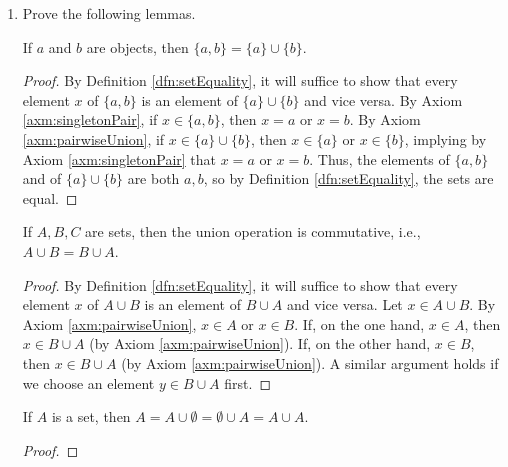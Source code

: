 \documentclass[../main.tex]{subfiles}
\begin{document}
\begin{enumerate}[ref={\thesection.\arabic*}]
\begin{proof}
    \end{proof}
    \item \label{exr:3.1.3}Prove the following lemmas.
    \begin{lem}\label{lem:commutativityUnion}
        If $a$ and $b$ are objects, then $\{a,b\}=\{a\}\cup\{b\}$.
        \begin{proof}
            By Definition \ref{dfn:setEquality}, it will suffice to show that every element $x$ of $\{a,b\}$ is an element of $\{a\}\cup\{b\}$ and vice versa. By Axiom \ref{axm:singletonPair}, if $x\in\{a,b\}$, then $x=a$ or $x=b$. By Axiom \ref{axm:pairwiseUnion}, if $x\in\{a\}\cup\{b\}$, then $x\in\{a\}$ or $x\in\{b\}$, implying by Axiom \ref{axm:singletonPair} that $x=a$ or $x=b$. Thus, the elements of $\{a,b\}$ and of $\{a\}\cup\{b\}$ are both $a,b$, so by Definition \ref{dfn:setEquality}, the sets are equal.
        \end{proof}
    \end{lem}
    \begin{lem}
        If $A,B,C$ are sets, then the union operation is commutative, i.e., $A\cup B=B\cup A$.
        \begin{proof}
            By Definition \ref{dfn:setEquality}, it will suffice to show that every element $x$ of $A\cup B$ is an element of $B\cup A$ and vice versa. Let $x\in A\cup B$. By Axiom \ref{axm:pairwiseUnion}, $x\in A$ or $x\in B$. If, on the one hand, $x\in A$, then $x\in B\cup A$ (by Axiom \ref{axm:pairwiseUnion}). If, on the other hand, $x\in B$, then $x\in B\cup A$ (by Axiom \ref{axm:pairwiseUnion}). A similar argument holds if we choose an element $y\in B\cup A$ first.
        \end{proof}
    \end{lem}
    \begin{lem}
        If $A$ is a set, then $A=A\cup\emptyset=\emptyset\cup A=A\cup A$.
        \begin{proof}

\end{proof}
\end{lem}
\end{enumerate}
\end{document}
